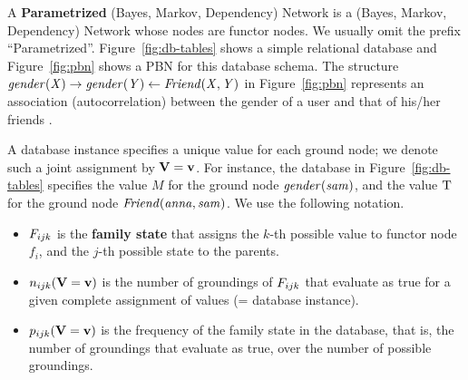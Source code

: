 \documentclass[twoside,leqno,twocolumn]{article}
\begin{document}


A \textbf{Parametrized} (Bayes, Markov, Dependency) Network is a (Bayes, Markov, Dependency) Network whose
nodes are functor nodes.  We usually omit the prefix ``Parametrized''. Figure~\ref{fig:db-tables} shows a simple relational database and Figure~\ref{fig:pbn} shows a PBN for this database schema. The structure $\it{gender}(X) \rightarrow \it{gender}(Y) \leftarrow \it{Friend}(X,Y)$ in Figure~\ref{fig:pbn} represents an association (autocorrelation) between the gender of a user and that of his/her friends  \cite{Schulte2012a}. 

A database instance specifies a unique value for each ground node; we denote such a joint assignment by $\mathbf{V} = \mathbf{v}$. For instance, the database in Figure~\ref{fig:db-tables} specifies the value $M$ for the ground node $\it{gender}(sam)$, and the value $\mathrm{T}$ for the ground node $\it{Friend}(anna,sam)$. We use the following notation. 
\begin{itemize}
\item$F_{ijk}$ is the \textbf{family state} that assigns the $k$-th possible value to functor node $f_{i}$, and the $j$-th possible state to the parents.
\item $n_{ijk}(\mathbf{V} = \mathbf{v})$ is the number of groundings of $F_{ijk}$ that evaluate as true for a given complete assignment of values (= database instance).
\item $p_{ijk}(\mathbf{V} = \mathbf{v})$ is the frequency of the family state in the database, that is, the number of groundings that evaluate as true, over the number of possible groundings.
\end{itemize}
\end{document}
